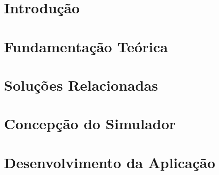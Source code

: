 \documentclass[
	12pt,				%
	openright,			%
	oneside,			%
	a4paper,			%
	english,			%
	french,				%
	spanish,			%
	brazil,				%
	]{abntex2}
\begin{document}



\listoffigures*
\cleardoublepage

\listoftables*
\cleardoublepage




\tableofcontents*
\cleardoublepage



\textual
\setcounter{page}{1}

\chapter{Introdução}
\label{cap-introducao}


\chapter{Fundamentação Teórica}
\label{cap-fundamentacao}


\chapter{Soluções Relacionadas}
\label{cap-solucoes}


\chapter{Concepção do Simulador}
\label{cap-simulador}


\chapter{Desenvolvimento da Aplicação}
\label{cap-aplicacao}

\end{document}
